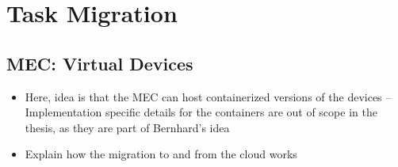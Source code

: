 
\chapter{Task Migration}\label{chap:migration}


\section{MEC: Virtual Devices}
\begin{itemize}
	\item Here, idea is that the MEC can host containerized versions of the devices -- Implementation specific details for the containers are out of scope in the thesis, as they are part of Bernhard's idea
	\item Explain how the migration to and from the cloud works 
\end{itemize}

	

